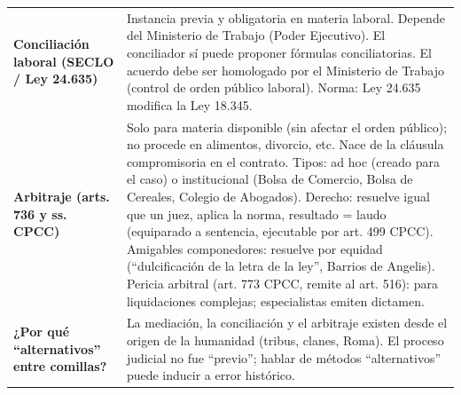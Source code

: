 \documentclass[12pt,oneside]{book}
\begin{document}
\begin{longtable}{@{}>{\raggedright\arraybackslash}p{} >{\raggedright\arraybackslash}X@{}}
\textbf{Conciliación laboral (SECLO / Ley 24.635)} &
Instancia previa y obligatoria en materia laboral. Depende del Ministerio de Trabajo (Poder Ejecutivo). El conciliador sí puede proponer fórmulas conciliatorias. El acuerdo debe ser homologado por el Ministerio de Trabajo (control de orden público laboral). Norma: Ley 24.635 modifica la Ley 18.345. \\

\textbf{Arbitraje (arts. 736 y ss. CPCC)} &
Solo para materia disponible (sin afectar el orden público); no procede en alimentos, divorcio, etc. Nace de la cláusula compromisoria en el contrato. Tipos: ad hoc (creado para el caso) o institucional (Bolsa de Comercio, Bolsa de Cereales, Colegio de Abogados). Derecho: resuelve igual que un juez, aplica la norma, resultado = laudo (equiparado a sentencia, ejecutable por art. 499 CPCC). Amigables componedores: resuelve por equidad (``dulcificación de la letra de la ley'', Barrios de Angelis). Pericia arbitral (art. 773 CPCC, remite al art. 516): para liquidaciones complejas; especialistas emiten dictamen. \\

\textbf{¿Por qué ``alternativos'' entre comillas?} &
La mediación, la conciliación y el arbitraje existen desde el origen de la humanidad (tribus, clanes, Roma). El proceso judicial no fue ``previo''; hablar de métodos ``alternativos'' puede inducir a error histórico. \\

\midrule


\end{longtable}
\end{document}
